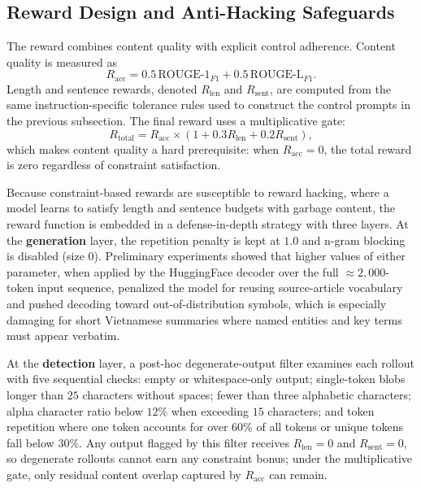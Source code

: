 \documentclass[11pt]{article}
\begin{document}
\subsection{Reward Design and Anti-Hacking Safeguards}
The reward combines content quality with explicit control adherence.
Content quality is measured as
\begin{equation}
R_{\text{acc}} = 0.5\,\mathrm{ROUGE\mbox{-}1}_{F1} + 0.5\,\mathrm{ROUGE\mbox{-}L}_{F1}.
\end{equation}
Length and sentence rewards, denoted $R_{\text{len}}$ and $R_{\text{sent}}$,
are computed from the same instruction-specific tolerance rules used to
construct the control prompts in the previous subsection.
The final reward uses a multiplicative gate:
\begin{equation}
R_{\text{total}} = R_{\text{acc}} \times \left(1 + 0.3 R_{\text{len}} + 0.2 R_{\text{sent}}\right),
\end{equation}
which makes content quality a hard prerequisite: when $R_{\text{acc}}=0$, the
total reward is zero regardless of constraint satisfaction.

Because constraint-based rewards are susceptible to reward hacking, where a
model learns to satisfy length and sentence budgets with garbage content, the
reward function is embedded in a defense-in-depth strategy with three layers.
At the \textbf{generation} layer, the repetition penalty is kept at
$1.0$ and n-gram blocking is disabled (size $0$). Preliminary experiments
showed that higher values of either parameter, when applied by the
HuggingFace decoder over the full $\approx 2{,}000$-token input sequence,
penalized the model for reusing source-article vocabulary and pushed decoding
toward out-of-distribution symbols, which is especially damaging for short
Vietnamese summaries where named entities and key terms must appear verbatim.

At the \textbf{detection} layer, a post-hoc degenerate-output filter
examines each rollout with five sequential
checks: empty or whitespace-only output; single-token blobs longer than $25$
characters without spaces; fewer than three alphabetic characters; alpha
character ratio below $12\%$ when exceeding $15$ characters; and token
repetition where one token accounts for over $60\%$ of all tokens or unique
tokens fall below $30\%$. Any output flagged by this filter receives
$R_{\text{len}}=0$ and $R_{\text{sent}}=0$, so degenerate rollouts cannot
earn any constraint bonus; under the multiplicative gate, only residual
content overlap captured by $R_{\text{acc}}$ can remain.
\end{document}
